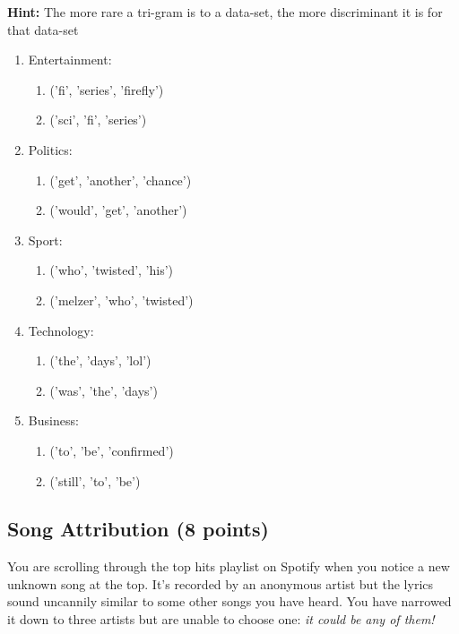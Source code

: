 \documentclass{exam}
\begin{document}
\textbf{Hint:} The more rare a tri-gram is to a data-set, the more discriminant it is for that data-set
\begin{enumerate}
    \item Entertainment:
    \begin{enumerate}
        \item ('fi', 'series', 'firefly')%
        \item ('sci', 'fi', 'series')%
    \end{enumerate}

    \item Politics:
    \begin{enumerate}
        \item ('get', 'another', 'chance')%
        \item ('would', 'get', 'another')%
    \end{enumerate}

    \item Sport:
    \begin{enumerate}
        \item ('who', 'twisted', 'his')%
        \item ('melzer', 'who', 'twisted')%
    \end{enumerate}


    \item Technology:
    \begin{enumerate}
        \item ('the', 'days', 'lol')%
        \item ('was', 'the', 'days') %
    \end{enumerate}

    \item Business:
    \begin{enumerate}
        \item ('to', 'be', 'confirmed')%
        \item ('still', 'to', 'be') %
    \end{enumerate}
\end{enumerate}

\newpage
\subsection{Song Attribution (8 points)}
You are scrolling through the top hits playlist on Spotify when you notice a new unknown song at the top. It's recorded by an anonymous artist but the lyrics sound uncannily similar to some other songs you have heard. You have narrowed it down to three artists but are unable to choose one: \textit{it could be any of them!}
\end{document}
